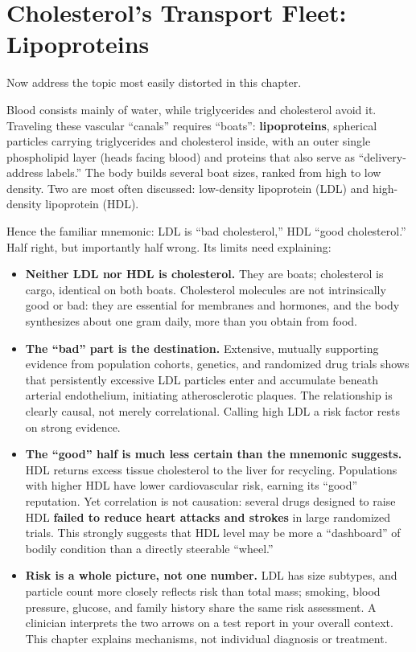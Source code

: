 \section{Cholesterol's Transport Fleet: Lipoproteins}

Now address the topic most easily distorted in this chapter.

Blood consists mainly of water, while triglycerides and cholesterol avoid it. Traveling these vascular ``canals'' requires ``boats'': \textbf{lipoproteins}, spherical particles carrying triglycerides and cholesterol inside, with an outer single phospholipid layer (heads facing blood) and proteins that also serve as ``delivery-address labels.'' The body builds several boat sizes, ranked from high to low density. Two are most often discussed: low-density lipoprotein (LDL) and high-density lipoprotein (HDL).

Hence the familiar mnemonic: LDL is ``bad cholesterol,'' HDL ``good cholesterol.'' Half right, but importantly half wrong. Its limits need explaining:

\begin{itemize}[itemsep=2pt]
\item \textbf{Neither LDL nor HDL is cholesterol.} They are boats; cholesterol is cargo, identical on both boats. Cholesterol molecules are not intrinsically good or bad: they are essential for membranes and hormones, and the body synthesizes about one gram daily, more than you obtain from food.
\item \textbf{The ``bad'' part is the destination.} Extensive, mutually supporting evidence from population cohorts, genetics, and randomized drug trials shows that persistently excessive LDL particles enter and accumulate beneath arterial endothelium, initiating atherosclerotic plaques. The relationship is clearly causal, not merely correlational. Calling high LDL a risk factor rests on strong evidence.
\item \textbf{The ``good'' half is much less certain than the mnemonic suggests.} HDL returns excess tissue cholesterol to the liver for recycling. Populations with higher HDL have lower cardiovascular risk, earning its ``good'' reputation. Yet correlation is not causation: several drugs designed to raise HDL \textbf{failed to reduce heart attacks and strokes} in large randomized trials. This strongly suggests that HDL level may be more a ``dashboard'' of bodily condition than a directly steerable ``wheel.''
\item \textbf{Risk is a whole picture, not one number.} LDL has size subtypes, and particle count more closely reflects risk than total mass; smoking, blood pressure, glucose, and family history share the same risk assessment. A clinician interprets the two arrows on a test report in your overall context. This chapter explains mechanisms, not individual diagnosis or treatment.
\end{itemize}

